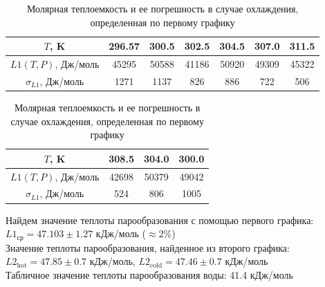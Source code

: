\begin{table}
    \centering
    \begin{tabular}{|c|c|c|c|c|c|c|}
        \hline
        $T$, K& 296.57 & 300.5 & 302.5 & 304.5 & 307.0 & 311.5\\\hline 
        $L1(T, P)$, Дж/моль & 45295 & 50588 & 41186 & 50920 & 49309 & 45322\\\hline 
        $\sigma_{L1}$, Дж/моль & 1271 & 1137 & 826 & 886 & 722 & 506\\\hline
    \end{tabular}
    \caption{Молярная теплоемкость и ее погрешность в случае нагревания
            , определенная по первому графику}
    \vfill
    \begin{tabular}{|c|c|c|c|}
        \hline
        $T$, K& 308.5 & 304.0 & 300.0\\\hline
        $L1(T, P)$, Дж/моль & 42698 & 50379 & 49042\\\hline
        $\sigma_{L1}$, Дж/моль & 524 & 806 & 1005\\\hline 
    \end{tabular}
    \caption{Молярная теплоемкость и ее погрешность в случае охлаждения, 
             определенная по первому графику}
\end{table}
Найдем значение теплоты парообразования с помощью первого графика:\\
$L1_{\text{ср}} = 47.103 \pm 1.27$ кДж/моль ($\approx 2\%$)\\\indent
Значение теплоты парообразования, найденное из второго графика:\\ 
$L2_{\text{hot}} = 47.85 \pm 0.7$ кДж/моль,  $L2_{\text{cold}} = 47.46 \pm 0.7$ кДж/моль\\\indent
Табличное значение теплоты парообразования воды: 41.4 кДж/моль

